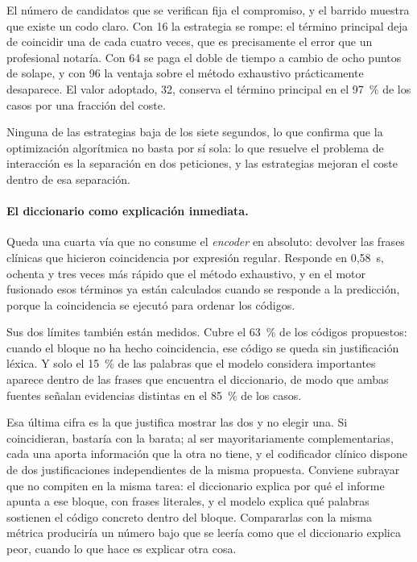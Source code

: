 El número de candidatos que se verifican fija el compromiso, y el barrido muestra que existe un codo claro. Con 16 la estrategia se rompe: el término principal deja de coincidir una de cada cuatro veces, que es precisamente el error que un profesional notaría. Con 64 se paga el doble de tiempo a cambio de ocho puntos de solape, y con 96 la ventaja sobre el método exhaustivo prácticamente desaparece. El valor adoptado, 32, conserva el término principal en el 97~\% de los casos por una fracción del coste.

Ninguna de las estrategias baja de los siete segundos, lo que confirma que la optimización algorítmica no basta por sí sola: lo que resuelve el problema de interacción es la separación en dos peticiones, y las estrategias mejoran el coste dentro de esa separación.

\paragraph{El diccionario como explicación inmediata.}
Queda una cuarta vía que no consume el \emph{encoder} en absoluto: devolver las frases clínicas que hicieron coincidencia por expresión regular. Responde en 0{,}58~s, ochenta y tres veces más rápido que el método exhaustivo, y en el motor fusionado esos términos ya están calculados cuando se responde a la predicción, porque la coincidencia se ejecutó para ordenar los códigos.

Sus dos límites también están medidos. Cubre el 63~\% de los códigos propuestos: cuando el bloque no ha hecho coincidencia, ese código se queda sin justificación léxica. Y solo el 15~\% de las palabras que el modelo considera importantes aparece dentro de las frases que encuentra el diccionario, de modo que ambas fuentes señalan evidencias distintas en el 85~\% de los casos.

Esa última cifra es la que justifica mostrar las dos y no elegir una. Si coincidieran, bastaría con la barata; al ser mayoritariamente complementarias, cada una aporta información que la otra no tiene, y el codificador clínico dispone de dos justificaciones independientes de la misma propuesta. Conviene subrayar que no compiten en la misma tarea: el diccionario explica por qué el informe apunta a ese bloque, con frases literales, y el modelo explica qué palabras sostienen el código concreto dentro del bloque. Compararlas con la misma métrica produciría un número bajo que se leería como que el diccionario explica peor, cuando lo que hace es explicar otra cosa.

